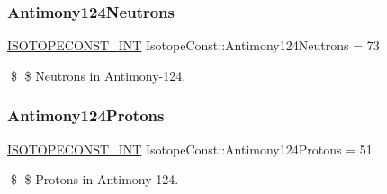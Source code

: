\subsubsection{\texorpdfstring{Antimony124\+Neutrons}{Antimony124Neutrons}}
{\footnotesize\ttfamily \mbox{\hyperlink{group___isotope_const-_macros_ga5f18360b3e99483a35c32d789e62621c}{I\+S\+O\+T\+O\+P\+E\+C\+O\+N\+S\+T\+\_\+\+I\+NT}} Isotope\+Const\+::\+Antimony124\+Neutrons = 73}

\$ \$ Neutrons in Antimony-\/124. \mbox{\label{group___isotope_const-_antimony-_sb124_ga45ae6e8d7463e3157c305d2bb41c120b}} 
\subsubsection{\texorpdfstring{Antimony124\+Protons}{Antimony124Protons}}
{\footnotesize\ttfamily \mbox{\hyperlink{group___isotope_const-_macros_ga5f18360b3e99483a35c32d789e62621c}{I\+S\+O\+T\+O\+P\+E\+C\+O\+N\+S\+T\+\_\+\+I\+NT}} Isotope\+Const\+::\+Antimony124\+Protons = 51}

\$ \$ Protons in Antimony-\/124. 